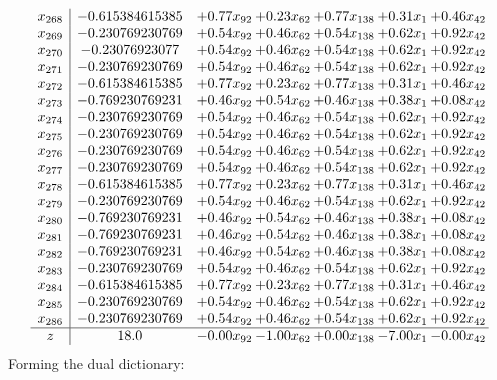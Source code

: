 \documentclass[8pt]{article}
\begin{document}
\[\begin{array}{c| c c@{\hskip 2pt} c@{\hskip 2pt} c@{\hskip 2pt} c@{\hskip 2pt} c@{\hskip 2pt} }
 x_{268}   &  -0.615384615385 & +  0.77 x_{92} & +  0.23 x_{62} & +  0.77 x_{138} & +  0.31 x_{1} & +  0.46 x_{42}\\
 x_{269}   &  -0.230769230769 & +  0.54 x_{92} & +  0.46 x_{62} & +  0.54 x_{138} & +  0.62 x_{1} & +  0.92 x_{42}\\
 x_{270}   &  -0.23076923077 & +  0.54 x_{92} & +  0.46 x_{62} & +  0.54 x_{138} & +  0.62 x_{1} & +  0.92 x_{42}\\
 x_{271}   &  -0.230769230769 & +  0.54 x_{92} & +  0.46 x_{62} & +  0.54 x_{138} & +  0.62 x_{1} & +  0.92 x_{42}\\
 x_{272}   &  -0.615384615385 & +  0.77 x_{92} & +  0.23 x_{62} & +  0.77 x_{138} & +  0.31 x_{1} & +  0.46 x_{42}\\
 x_{273}   &  -0.769230769231 & +  0.46 x_{92} & +  0.54 x_{62} & +  0.46 x_{138} & +  0.38 x_{1} & +  0.08 x_{42}\\
 x_{274}   &  -0.230769230769 & +  0.54 x_{92} & +  0.46 x_{62} & +  0.54 x_{138} & +  0.62 x_{1} & +  0.92 x_{42}\\
 x_{275}   &  -0.230769230769 & +  0.54 x_{92} & +  0.46 x_{62} & +  0.54 x_{138} & +  0.62 x_{1} & +  0.92 x_{42}\\
 x_{276}   &  -0.230769230769 & +  0.54 x_{92} & +  0.46 x_{62} & +  0.54 x_{138} & +  0.62 x_{1} & +  0.92 x_{42}\\
 x_{277}   &  -0.230769230769 & +  0.54 x_{92} & +  0.46 x_{62} & +  0.54 x_{138} & +  0.62 x_{1} & +  0.92 x_{42}\\
 x_{278}   &  -0.615384615385 & +  0.77 x_{92} & +  0.23 x_{62} & +  0.77 x_{138} & +  0.31 x_{1} & +  0.46 x_{42}\\
 x_{279}   &  -0.230769230769 & +  0.54 x_{92} & +  0.46 x_{62} & +  0.54 x_{138} & +  0.62 x_{1} & +  0.92 x_{42}\\
 x_{280}   &  -0.769230769231 & +  0.46 x_{92} & +  0.54 x_{62} & +  0.46 x_{138} & +  0.38 x_{1} & +  0.08 x_{42}\\
 x_{281}   &  -0.769230769231 & +  0.46 x_{92} & +  0.54 x_{62} & +  0.46 x_{138} & +  0.38 x_{1} & +  0.08 x_{42}\\
 x_{282}   &  -0.769230769231 & +  0.46 x_{92} & +  0.54 x_{62} & +  0.46 x_{138} & +  0.38 x_{1} & +  0.08 x_{42}\\
 x_{283}   &  -0.230769230769 & +  0.54 x_{92} & +  0.46 x_{62} & +  0.54 x_{138} & +  0.62 x_{1} & +  0.92 x_{42}\\
 x_{284}   &  -0.615384615385 & +  0.77 x_{92} & +  0.23 x_{62} & +  0.77 x_{138} & +  0.31 x_{1} & +  0.46 x_{42}\\
 x_{285}   &  -0.230769230769 & +  0.54 x_{92} & +  0.46 x_{62} & +  0.54 x_{138} & +  0.62 x_{1} & +  0.92 x_{42}\\
 x_{286}   &  -0.230769230769 & +  0.54 x_{92} & +  0.46 x_{62} & +  0.54 x_{138} & +  0.62 x_{1} & +  0.92 x_{42}\\
\hline
z    &  18.0 & -0.00 x_{92} & -1.00 x_{62} & +  0.00 x_{138} & -7.00 x_{1} & -0.00 x_{42}\\
\end{array}\]
Forming the dual dictionary:
\end{document}
